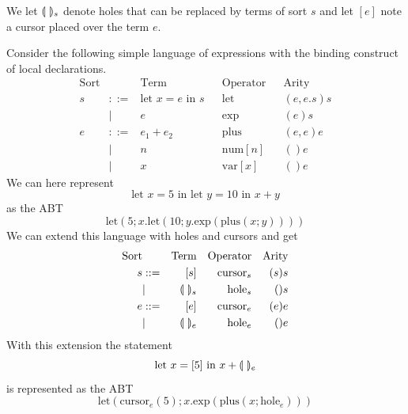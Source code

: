 \documentclass[sigplan,review]{acmart}
\begin{document}
We let $\llparenthesis \ \rrparenthesis_s$ denote holes that can be replaced by terms of sort
$s$ and let $[e]$ note a cursor placed over the term $e$.

\begin{example}\label{ex:abstract_syntax}
Consider the following simple language of expressions with the binding
construct of local declarations.
\begin{align*}
  \text{Sort} && \text{Term} && \text{Operator} && \text{Arity} \\
        s & ::= & \text{let $x = e$ in $s$} && \text{let} && (e, e.s)s \\
        & | & e && \text{exp} && (e)s \\
  e & ::= & e_1 + e_2 && \text{plus} && (e,e)e \\
        & | & n && \text{num}[n] &&  ()e \\
        & | & x && \text{var}[x] && ()e
\end{align*}
 We can here represent
    \begin{equation*}
        \text{let $x=5$ in let $y=10$ in $x+y$}
    \end{equation*}
    as the ABT
    \begin{equation*}
        \text{let}(5;x.\text{let}(10;y.\text{exp}(\text{plus}(x;y))))
    \end{equation*} 
%
    We can extend this language with holes and cursors and get
\begin{align*}
        \text{Sort} && \text{Term} && \text{Operator} && \text{Arity} \\
        s & ::= & [s] && \text{cursor}_s && (s)s \\
        & | & \llparenthesis \ \rrparenthesis_s && \text{hole}_s && ()s \\
        e & ::= & [e] && \text{cursor}_e && (e)e \\
        & | & \llparenthesis \ \rrparenthesis_e && \text{hole}_e && ()e
 \end{align*}
%
    With this extension the statement
    \begin{equation*}
        \text{let $x=[5]$ in $x+\llparenthesis \ \rrparenthesis_e$}
    \end{equation*}
    is represented as the ABT
    \begin{equation*}
        \text{let}(\text{cursor}_e(5); x.\text{exp}(\text{plus}(x;\text{hole}_e)))    
    \end{equation*}
\end{example}
\end{document}
